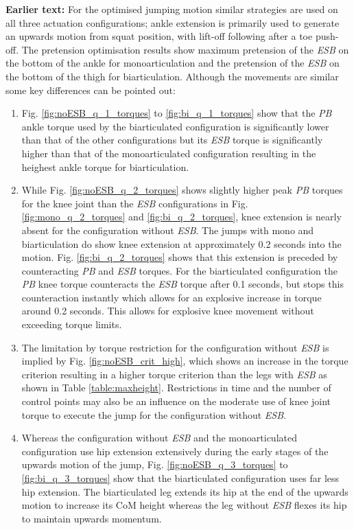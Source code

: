 \documentclass[letterpaper, 10 pt, conference]{ieeeconf}  %
\begin{document}
	\textbf{Earlier text:}
	For the optimised jumping motion similar strategies are used on all three actuation configurations; ankle extension is primarily used to generate an upwards motion from squat position, with lift-off following after a toe push-off. The pretension optimisation results show maximum pretension of the \textit{ESB} on the bottom of the ankle for monoarticulation and the pretension of the \textit{ESB} on the bottom of the thigh for biarticulation. Although the movements are similar some key differences can be pointed out:
	
	\begin{enumerate}
		\item Fig. \ref{fig:noESB_q_1_torques} to \ref{fig:bi_q_1_torques} show that the \textit{PB} ankle torque used by the biarticulated configuration is significantly lower than that of the other configurations but its \textit{ESB} torque is significantly higher than that of the monoarticulated configuration resulting in the heighest ankle torque for biarticulation. 
		
		\item While Fig. \ref{fig:noESB_q_2_torques} shows slightly higher peak \textit{PB} torques for the knee joint than the \textit{ESB} configurations in Fig. \ref{fig:mono_q_2_torques} and \ref{fig:bi_q_2_torques}, knee extension is nearly absent for the configuration without \textit{ESB}. The jumps with mono and biarticulation do show knee extension at approximately 0.2 seconds into the motion. Fig. \ref{fig:bi_q_2_torques} shows that this extension is preceded by counteracting \textit{PB} and \textit{ESB} torques. For the biarticulated configuration the \textit{PB} knee torque counteracts the \textit{ESB} torque after 0.1 seconds, but stops this counteraction instantly which allows for an explosive increase in torque around 0.2 seconds. This allows for explosive knee movement without exceeding torque limits.
		
		\item The limitation by torque restriction for the configuration without \textit{ESB} is implied by Fig. \ref{fig:noESB_crit_high}, which shows an increase in the torque criterion resulting in a higher torque criterion than the legs with \textit{ESB} as shown in Table \ref{table:maxheight}. Restrictions in time and the number of control points may also be an influence on the moderate use of knee joint torque to execute the jump for the configuration without \textit{ESB}.
		
		\item Whereas the configuration without \textit{ESB} and the monoarticulated configuration use hip extension extensively during the early stages of the upwards motion of the jump, Fig. \ref{fig:noESB_q_3_torques} to \ref{fig:bi_q_3_torques} show that the biarticulated configuration uses far less hip extension. The biarticulated leg extends its hip at the end of the upwards motion to increase its CoM height whereas the leg without \textit{ESB} flexes its hip to maintain upwards momentum.
		

\end{enumerate}
\end{document}
